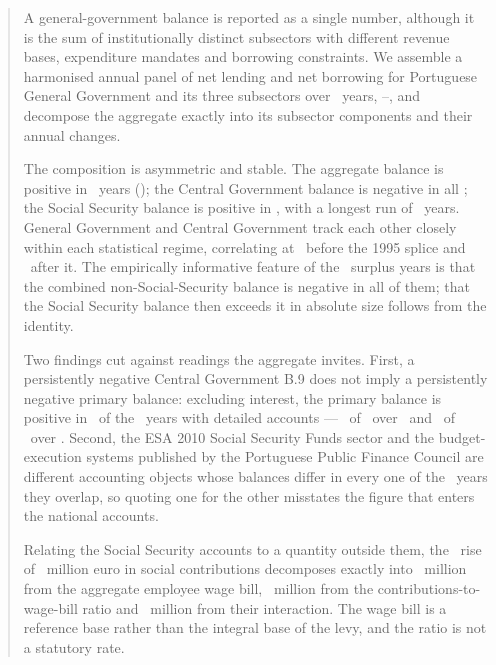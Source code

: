 
\begin{abstract}
\noindent
A general-government balance is reported as a single number, although it is the sum
of institutionally distinct subsectors with different revenue bases, expenditure
mandates and borrowing constraints. We assemble a harmonised annual panel of net
lending and net borrowing for Portuguese General Government and its three
subsectors over \PanelYears\ years, \PanelStart--\PanelEnd, and decompose the
aggregate exactly into its subsector components and their annual changes.

\noindent
The composition is asymmetric and stable. The aggregate balance is positive in
\NumPositiveYears\ years (\PositiveYearList); the Central Government balance is
negative in all \CentralNegativeYears; the Social Security balance is positive in
\SsfPositiveYears, with a longest run of \SsfLongestPositiveRun\ years. General
Government and Central Government track each other closely within each statistical
regime, correlating at \HistoricalTrackingCorrelation\ before the 1995 splice and
\ModernTrackingCorrelation\ after it. The empirically informative
feature of the \NumPositiveYears\ surplus years is that the combined
non-Social-Security balance is negative in all of them; that the Social Security
balance then exceeds it in absolute size follows from the identity.

\noindent
Two findings cut against readings the aggregate invites. First, a persistently
negative Central Government B.9 does not imply a persistently negative primary
balance: excluding interest, the primary balance is positive in
\PrimaryPositiveYears\ of the \PrimaryObservedYears\ years with detailed accounts ---
\HistoricalPrimaryPositive\ of \HistoricalPrimaryYears\ over \HistoricalPrimaryWindow\ and
\ModernPrimaryPositive\ of \ModernPrimaryYears\ over \ModernPrimaryWindow. Second, the ESA 2010 Social
Security Funds sector and the budget-execution systems published by the Portuguese
Public Finance Council are different accounting objects whose balances differ in
every one of the \SsfBoundaryYears\ years they overlap, so quoting one for the
other misstates the figure that enters the national accounts.

\noindent
Relating the Social Security accounts to a quantity outside them, the \BaseYear\ rise of
\BaseContributionsChange\ million euro in social contributions decomposes exactly into
\BaseFromWageBill\ million from the aggregate employee wage bill, \BaseFromRatio\ million
from the contributions-to-wage-bill ratio and \BaseRatioInteraction\ million from their
interaction. The wage bill is a reference base rather than the integral base of the levy,
and the ratio is not a statutory rate.


\end{abstract}
